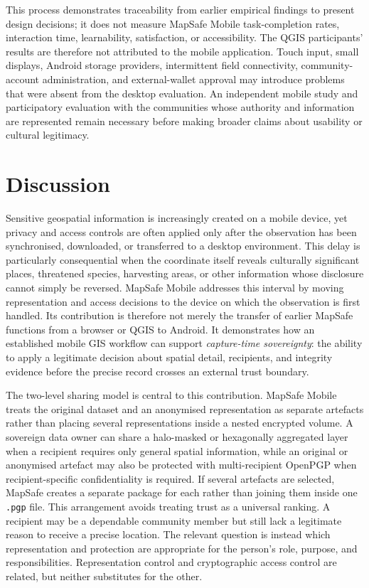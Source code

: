 \documentclass[a4paper,UKenglish,cleveref,autoref,thm-restate]{lipics-v2021}
\begin{document}
This process demonstrates traceability from earlier empirical findings to present design decisions; it does not measure MapSafe Mobile task-completion rates, interaction time, learnability, satisfaction, or accessibility. The QGIS participants' results are therefore not attributed to the mobile application. Touch input, small displays, Android storage providers, intermittent field connectivity, community-account administration, and external-wallet approval may introduce problems that were absent from the desktop evaluation. An independent mobile study and participatory evaluation with the communities whose authority and information are represented remain necessary before making broader claims about usability or cultural legitimacy.


\section{Discussion}
\label{sec:discussion}

Sensitive geospatial information is increasingly created on a mobile device, yet privacy and access controls are often applied only after the observation has been synchronised, downloaded, or transferred to a desktop environment. This delay is particularly consequential when the coordinate itself reveals culturally significant places, threatened species, harvesting areas, or other information whose disclosure cannot simply be reversed. MapSafe Mobile addresses this interval by moving representation and access decisions to the device on which the observation is first handled. Its contribution is therefore not merely the transfer of earlier MapSafe functions from a browser or QGIS to Android. It demonstrates how an established mobile GIS workflow can support \emph{capture-time sovereignty}: the ability to apply a legitimate decision about spatial detail, recipients, and integrity evidence before the precise record crosses an external trust boundary.

The two-level sharing model is central to this contribution. MapSafe Mobile treats the original dataset and an anonymised representation as separate artefacts rather than placing several representations inside a nested encrypted volume. A sovereign data owner can share a halo-masked or hexagonally aggregated layer when a recipient requires only general spatial information, while an original or anonymised artefact may also be protected with multi-recipient OpenPGP when recipient-specific confidentiality is required. If several artefacts are selected, MapSafe creates a separate package for each rather than joining them inside one \texttt{.pgp} file. This arrangement avoids treating trust as a universal ranking. A recipient may be a dependable community member but still lack a legitimate reason to receive a precise location. The relevant question is instead which representation and protection are appropriate for the person's role, purpose, and responsibilities. Representation control and cryptographic access control are related, but neither substitutes for the other.
\end{document}
